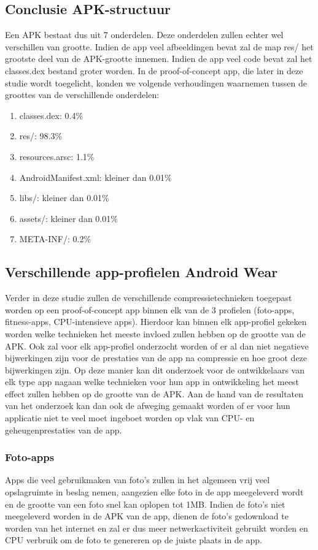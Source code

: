 \subsection{Conclusie APK-structuur}
Een APK bestaat dus uit 7 onderdelen. Deze onderdelen zullen echter wel verschillen van grootte. Indien de app veel afbeeldingen bevat zal de map res/ het grootste deel van de APK-grootte innemen. Indien de app veel code bevat zal het classes.dex bestand groter worden. In de proof-of-concept app, die later in deze studie wordt toegelicht, konden we volgende verhoudingen waarnemen tussen de groottes van de verschillende onderdelen: 
\begin{enumerate}
	\item classes.dex: 0.4\%
	\item res/: 98.3\%
	\item resources.arsc: 1.1\%
	\item AndroidManifest.xml: kleiner dan 0.01\%
	\item libs/: kleiner dan 0.01\%
	\item assets/: kleiner dan 0.01\%
	\item META-INF/: 0.2\% 
\end{enumerate}

\subsection{Verschillende app-profielen Android Wear}
Verder in deze studie zullen de verschillende compressietechnieken toegepast worden op een proof-of-concept app binnen elk van de 3 profielen (foto-apps, fitness-apps, CPU-intensieve apps). Hierdoor kan binnen elk app-profiel gekeken worden welke technieken het meeste invloed zullen hebben op de grootte van de APK. Ook zal voor elk app-profiel onderzocht worden of er al dan niet negatieve bijwerkingen zijn voor de prestaties van de app na compressie en hoe groot deze bijwerkingen zijn. Op deze manier kan dit onderzoek voor de ontwikkelaars van elk type app nagaan welke technieken voor hun app in ontwikkeling het meest effect zullen hebben op de grootte van de APK. Aan de hand van de resultaten van het onderzoek kan dan ook de afweging gemaakt worden of er voor hun applicatie niet te veel moet ingeboet worden op vlak van CPU- en geheugenprestaties van de app.

\subsubsection{Foto-apps}
Apps die veel gebruikmaken van foto's zullen in het algemeen vrij veel opslagruimte in beslag nemen, aangezien elke foto in de app meegeleverd wordt en de grootte van een foto snel kan oplopen tot 1MB. Indien de foto's niet meegeleverd worden in de APK van de app, dienen de foto's gedownload te worden van het internet en zal er dus meer netwerkactiviteit gebruikt worden en CPU verbruik om de foto te genereren op de juiste plaats in de app.
